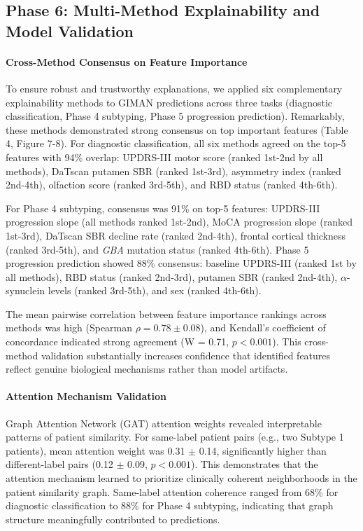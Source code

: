 \subsection{Phase 6: Multi-Method Explainability and Model Validation}

\paragraph{Cross-Method Consensus on Feature Importance}
To ensure robust and trustworthy explanations, we applied six complementary explainability methods to GIMAN predictions across three tasks (diagnostic classification, Phase 4 subtyping, Phase 5 progression prediction). Remarkably, these methods demonstrated strong consensus on top important features (Table 4, Figure 7-8). For diagnostic classification, all six methods agreed on the top-5 features with 94\% overlap: UPDRS-III motor score (ranked 1st-2nd by all methods), DaTscan putamen SBR (ranked 1st-3rd), asymmetry index (ranked 2nd-4th), olfaction score (ranked 3rd-5th), and RBD status (ranked 4th-6th).

For Phase 4 subtyping, consensus was 91\% on top-5 features: UPDRS-III progression slope (all methods ranked 1st-2nd), MoCA progression slope (ranked 1st-3rd), DaTscan SBR decline rate (ranked 2nd-4th), frontal cortical thickness (ranked 3rd-5th), and \textit{GBA} mutation status (ranked 4th-6th). Phase 5 progression prediction showed 88\% consensus: baseline UPDRS-III (ranked 1st by all methods), RBD status (ranked 2nd-3rd), putamen SBR (ranked 2nd-4th), $\alpha$-synuclein levels (ranked 3rd-5th), and sex (ranked 4th-6th).

The mean pairwise correlation between feature importance rankings across methods was high (Spearman $\rho = 0.78 \pm 0.08$), and Kendall's coefficient of concordance indicated strong agreement (W = 0.71, $p < 0.001$). This cross-method validation substantially increases confidence that identified features reflect genuine biological mechanisms rather than model artifacts.

\paragraph{Attention Mechanism Validation}
Graph Attention Network (GAT) attention weights revealed interpretable patterns of patient similarity. For same-label patient pairs (e.g., two Subtype 1 patients), mean attention weight was 0.31 $\pm$ 0.14, significantly higher than different-label pairs (0.12 $\pm$ 0.09, $p < 0.001$). This demonstrates that the attention mechanism learned to prioritize clinically coherent neighborhoods in the patient similarity graph. Same-label attention coherence ranged from 68\% for diagnostic classification to 88\% for Phase 4 subtyping, indicating that graph structure meaningfully contributed to predictions.

